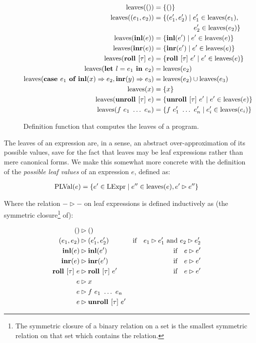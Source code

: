 \begin{figure}[tp]
\begin{align*}
  \leaves( () ) & = \left\{()\right\} \\
  \leaves((e_1, e_2)) & = \{ (e_1',e_2') \mid e_1' \in \leaves(e_1), \\
  & \phantom{= \{ (e_1',e_2') \mid}\ \ e_2' \in \leaves(e_2) \} \\
  \leaves(\inl{e}) & = \left\{ \inl{e'} \mid e' \in \leaves(e) \right\}\\
  \leaves(\inr{e}) & = \left\{ \inr{e'} \mid e' \in \leaves(e) \right\}\\
  \leaves(\roll{\tau}{e}) & = \left\{ \roll{\tau}{e'} \mid e' \in \leaves(e)
  \right\}\\
  \leaves(\textbf{let $l = e_1$ in $e_2$}) & = \leaves(e_2) \\
  \leaves(\caseof{e_1}{\inl{x}}{e_2}{\inr{y}}{e_3}) & = \leaves(e_2) \cup \leaves(e_3) \\
  \leaves(x) & = \{x\} \\
  \leaves(\unroll{\tau}{e}) & = \{\unroll{\tau}{e'} \mid e' \in \leaves(e) \}\\
  \leaves(f~e_1~\dots~e_n) & = \{f~e_1'~\dots~e_n' \mid e_i' \in \leaves(e_i) \}
\end{align*}
\caption{Definition function that computes the leaves of a program.}
\label{fig:leaves}
\end{figure}

The leaves of an expression are, in a sense, an abstract over-approximation of
its possible values, save for the fact that leaves may be leaf expressions
rather than mere canonical forms. We make this somewhat more concrete with the
definition of the \emph{possible leaf values} of an expression $e$, defined as:

\begin{align}
  \text{PLVal}(e) = \{ e' \in \text{LExpr} \mid e'' \in \text{leaves}(e), e' \rhd e'' \}
  \label{def:PLVal}
\end{align}

Where the relation $- \rhd -$ on leaf expressions is defined inductively as
(the symmetric closure\footnote{The symmetric closure of a binary relation on
a set is the smallest symmetric relation on that set which contains the
relation.} of):

\begin{align}
  () & \rhd () \nonumber \\
  (e_1, e_2) & \rhd (e_1', e_2')  & \text{if} \quad e_1 \rhd e_1'
  \text{ and } e_2 \rhd e_2' \nonumber \\
  \textbf{inl}(e) & \rhd \textbf{inl}(e') & \text{if} \quad e \rhd e' \nonumber
  \label{def:rhd_relation} \\
  \textbf{inr}(e) & \rhd \textbf{inr}(e') & \text{if} \quad e \rhd e' \\
  \textbf{roll } [\tau]\ e & \rhd \textbf{roll } [\tau]\ e' & \text{if} \quad e \rhd e' \nonumber \\
  e & \rhd x \nonumber \\
  e & \rhd f~e_1~\dots~e_n \nonumber \\
  e & \rhd \textbf{unroll } [\tau]\ e' \nonumber
\end{align}

